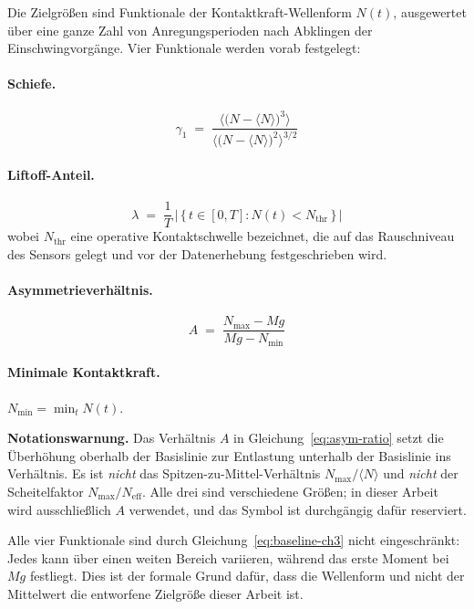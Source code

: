 \documentclass[12pt,a4paper]{report}
\begin{document}
Die Zielgrößen sind Funktionale der Kontaktkraft-Wellenform $N(t)$,
ausgewertet über eine ganze Zahl von Anregungsperioden nach Abklingen der
Einschwingvorgänge. Vier Funktionale werden vorab festgelegt:

\paragraph{Schiefe.}
\begin{equation}
  \gamma_1 \;=\;
  \frac{\bigl\langle \bigl(N - \langle N\rangle\bigr)^3 \bigr\rangle}
       {\bigl\langle \bigl(N - \langle N\rangle\bigr)^2 \bigr\rangle^{3/2}}
  \label{eq:skewness}
\end{equation}

\paragraph{Liftoff-Anteil.}
\begin{equation}
  \lambda \;=\;
  \frac{1}{T}\,\bigl|\,\{\,t \in [0,T] : N(t) < N_{\mathrm{thr}} \,\}\,\bigr|
  \label{eq:liftoff}
\end{equation}
wobei $N_{\mathrm{thr}}$ eine operative Kontaktschwelle bezeichnet, die
auf das Rauschniveau des Sensors gelegt und vor der Datenerhebung
festgeschrieben wird.

\paragraph{Asymmetrieverhältnis.}
\begin{equation}
  A \;=\; \frac{N_{\max} - Mg}{Mg - N_{\min}}
  \label{eq:asym-ratio}
\end{equation}

\paragraph{Minimale Kontaktkraft.} $N_{\min} = \min_{t} N(t)$.

\medskip
\noindent
\textbf{Notationswarnung.} Das Verhältnis $A$ in
Gleichung~\eqref{eq:asym-ratio} setzt die Überhöhung oberhalb der
Basislinie zur Entlastung unterhalb der Basislinie ins Verhältnis. Es ist
\emph{nicht} das Spitzen-zu-Mittel-Verhältnis
$N_{\max}/\langle N \rangle$ und \emph{nicht} der Scheitelfaktor
$N_{\max}/N_{\mathrm{eff}}$. Alle drei sind verschiedene Größen; in
dieser Arbeit wird ausschließlich $A$ verwendet, und das Symbol ist
durchgängig dafür reserviert.

\medskip
\noindent
Alle vier Funktionale sind durch Gleichung~\eqref{eq:baseline-ch3} nicht
eingeschränkt: Jedes kann über einen weiten Bereich variieren, während
das erste Moment bei $Mg$ festliegt. Dies ist der formale Grund dafür,
dass die Wellenform und nicht der Mittelwert die entworfene Zielgröße
dieser Arbeit ist.
\end{document}
